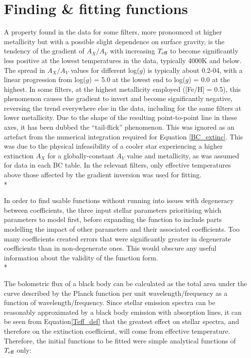 \documentclass[12pt, a4paper]{report}
\begin{document}
\section{Finding \& fitting functions} \label{find_fit}
A property found in the data for some filters, more pronounced at higher metallicity but with a possible slight dependence on surface gravity, is the tendency of the gradient of $A_{X}/A_{V}$ with increasing $T_{\textnormal{eff}}$ to become significantly less positive at the lowest temperatures in the data, typically 4000K and below. The spread in $A_{X}/A_{V}$ values for different log($g$) is typically about 0.2-04, with a linear progression from log($g$) = 5.0 at the lowest end to log($g$) = 0.0 at the highest. In some filters, at the highest metallicity employed ([Fe/H] = 0.5), this phenomenon causes the gradient to invert and become significantly negative, reversing the trend everywhere else in the data, including for the same filters at lower metallicity. Due to the shape of the resulting point-to-point line in these axes, it has been dubbed the ``tail-flick'' phenomenon. This was ignored as an artefact from the numerical integration required for Equation \ref{BC_extinc}. This was due to the physical infeasibility of a cooler star experiencing a higher extinction $A_{X}$ for a globally-constant $A_{V}$ value and metallicity, as was assumed for data in each BC table. In the relevant filters, only effective temperatures above those affected by the gradient inversion was used for fitting.\\*

In order to find usable functions without running into issues with degeneracy between coefficients, the three input stellar parameters prioritising which parameters to model first, before expanding the function to include parts modelling the impact of other parameters and their associated coefficients. Too many coefficients created errors that were significantly greater in degenerate coefficients than in non-degenerate ones. This would obscure any useful information about the validity of the function form.\\*

The bolometric flux of a black body can be calculated as the total area under the curve described by the Planck function per unit wavelength/frequency as a function of wavelength/frequency. Since stellar emission spectra can be reasonably approximated by a black body emission with absorption lines, it can be seen from Equation\ref{Teff_def} that the greatest effect on stellar spectra, and therefore on the extinction coefficient, will come from effective temperature. Therefore, the initial functions to be fitted were simple analytical functions of $T_{\textnormal{eff}}$ only:
\end{document}
